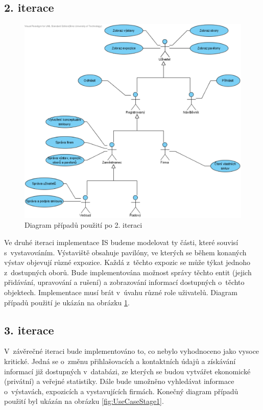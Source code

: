 \subsection*{2. iterace}

\begin{figure}[h]
	\begin{center}
		\includegraphics[width=12.5cm,keepaspectratio]{include/use_case_stage2}
	\end{center}
	\caption{Diagram případů použití po 2. iteraci}
	\label{fig:UseCaseStage2}
\end{figure}

Ve druhé iteraci implementace IS budeme modelovat ty části, které souvisí
s~vystavováním. Výstaviště obsahuje pavilóny, ve kterých se během konaných
výstav objevují různé expozice. Každá z~těchto expozic se může týkat jednoho
z~dostupných oborů. Bude implementována možnost správy těchto entit (jejich
přidávání, upravování a rušení) a zobrazování informací dostupných o~těchto
objektech. Implementace musí brát v~úvahu různé role uživatelů. Diagram případů
použití je ukázán na obrázku \ref{fig:UseCaseStage2}.

\subsection*{3. iterace}

V~závěrečné iteraci bude implementováno to, co nebylo vyhodnoceno jako vysoce
kritické. Jedná se o~změnu přihlašovacích a kontaktních údajů a získávání
informací již dostupných v~databázi, ze kterých se budou vytvářet ekonomické
(privátní) a veřejné statistiky. Dále bude umožněno vyhledávat informace
o~výstavách, expozicích a vystavujících firmách. Konečný diagram případů
použití byl ukázán na obrázku \ref{fig:UseCaseStage1}.

